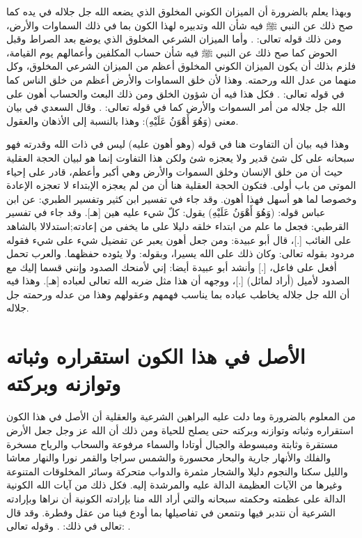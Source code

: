 وبهذا يعلم بالضرورة أن الميزان الكوني المخلوق الذي يضعه الله جل جلاله في يده كما صح ذلك عن النبي ﷺ فيه شأن الله وتدبيره لهذا الكون بما في ذلك السماوات والأرض، ومن ذلك قوله تعالى: \quranayah*[55][29]{\footnotesize \surahname*[55]}. وأما الميزان الشرعي المخلوق الذي يوضع بعد الصراط وقبل الحوض كما صح ذلك عن النبي ﷺ فيه شأن حساب المكلفين وأعمالهم يوم القيامة، فلزم بذلك أن يكون الميزان الكوني المخلوق أعظم من الميزان الشرعي المخلوق، وكل منهما من عدل الله ورحمته. وهذا لأن خلق السماوات والأرض أعظم من خلق الناس كما في قوله تعالى: 
\quranayah*[40][57]{\footnotesize \surahname*[40]}. فكل هذا فيه أن شؤون الخلق ومن ذلك البعث والحساب أهون على الله جل جلاله من أمر السموات والأرض كما في قوله تعالى: 
\quranayah*[30][27]{\footnotesize \surahname*[30]}. وقال السعدي في بيان معنى (وَهُوَ أَهْوَنُ عَلَيْهِ): وهذا بالنسبة إلى الأذهان والعقول.

وهذا فيه بيان أن التفاوت هنا في قوله (وهو أهون عليه) ليس في ذات الله وقدرته فهو سبحانه على كل شئ قدير ولا يعجزه شئ ولكن هذا التفاوت إنما هو لبيان الحجة العقلية حيث أن من خلق الإنسان وخلق السموات والأرض وهي أكبر وأعظم، قادر على إحياء الموتى من باب أولى. فتكون الحجة العقلية هنا أن من لم يعجزه الإبتداء لا تعجزه الإعادة وخصوصا لما هو أسهل فهذا أهون. وقد جاء في تفسير ابن كثير وتفسير الطبري: عن ابن عباس قوله: (وَهُوَ أَهْوَنُ عَلَيْهِ) يقول: كلّ شيء عليه هين [هـ]. وقد جاء في تفسير القرطبي: فجعل ما علم من ابتداء خلقه دليلا على ما يخفى من إعادته;استدلالا بالشاهد على الغائب [.]، قال أبو عبيدة: ومن جعل أهون يعبر عن تفضيل شيء على شيء فقوله مردود بقوله تعالى: وكان ذلك على الله يسيرا، وبقوله: ولا يئوده حفظهما. والعرب تحمل أفعل على فاعل، [.] وأنشد أبو عبيدة أيضا: إني لأمنحك الصدود وإنني قسما إليك مع الصدود لأميل (أراد لمائل) [.]، ووجهه أن هذا مثل ضربه الله تعالى لعباده [هـ]. وهذا فيه أن الله جل جلاله يخاطب عباده بما يناسب فهمهم وعقولهم وهذا من عدله ورحمته جل جلاله.

\section{الأصل في هذا الكون استقراره وثباته وتوازنه وبركته}

من المعلوم بالضرورة وما دلت عليه البراهين الشرعية والعقلية أن الأصل في هذا الكون استقراره وثباته وتوازنه وبركته حتى يصلح للحياة ومن ذلك أن الله عز وجل جعل الأرض مستقرة وثابتة ومبسوطة والجبال أوتادا والسماء مرفوعة والسحاب والرياح مسخرة والفلك والأنهار جارية والبحار محسورة والشمس سراجا والقمر نورا والنهار معاشا والليل سكنا والنجوم دليلا والشجار مثمرة والدواب متحركة وسائر المخلوقات المتنوعة وغيرها من الآيات العظيمة الدالة عليه والمرشدة إليه. فكل ذلك من آيات الله الكونية الدالة على عظمته وحكمته سبحانه والتي أراد الله منا بإرادته الكونية أن نراها وبإرادته الشرعية أن نتدبر فيها ونتمعن في تفاصيلها بما أودع فينا من عقل وفطرة. وقد قال تعالى في ذلك: 
\quranayah*[27][93]{\footnotesize \surahname*[27]}. وقوله تعالى:
\quranayah*[41][53]{\footnotesize \surahname*[41]}.

